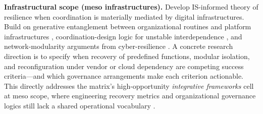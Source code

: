 \textbf{Infrastructural scope (meso infrastructures).} Develop IS-informed theory of resilience when coordination is materially mediated by digital infrastructures. Build on generative entanglement between organizational routines and platform infrastructures \autocite{henfridsson2013generative}, coordination-design logic for unstable interdependence \autocite{galbraith1973designing}, and network-modularity arguments from cyber-resilience \autocite{albert2000error,linkov2013resilience,panteli2017metrics}. A concrete research direction is to specify when recovery of predefined functions, modular isolation, and reconfiguration under vendor or cloud dependency are competing success criteria---and which governance arrangements \autocite{boin2013resilient,dupont2019cyberresilience} make each criterion actionable. This directly addresses the matrix's high-opportunity \emph{integrative frameworks} cell at meso scope, where engineering recovery metrics and organizational governance logics still lack a shared operational vocabulary \autocite{bruneau2003framework,kuypers2018designing}.

